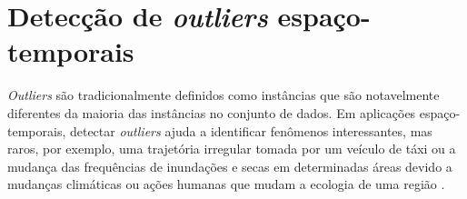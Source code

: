 \begin{figure}[!ht]
	\centering
\end{figure}

\section{Detecção de \textit{outliers} espaço-temporais}
\textit{Outliers} são tradicionalmente definidos como instâncias que são notavelmente diferentes da maioria das instâncias no conjunto de dados. Em aplicações espaço-temporais, detectar \textit{outliers} ajuda a identificar fenômenos interessantes, mas raros, por exemplo, uma trajetória irregular tomada por um veículo de táxi ou a mudança das frequências de inundações e secas em determinadas áreas devido a mudanças climáticas ou ações humanas que mudam a ecologia de uma região \cite{Atluri:2018}.

